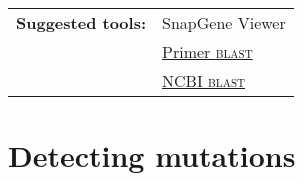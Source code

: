 \documentclass[11pt]{article}
\begin{document}
	\vspace*{\baselineskip}

\noindent\begin{tabular}{@{}ll}
	\textbf{Suggested tools:} & SnapGene Viewer \\
	& \href{https://www.ncbi.nlm.nih.gov/tools/primer-blast/}{Primer \textsc{blast}} \\
	& \href{https://blast.ncbi.nlm.nih.gov/Blast.cgi}{NCBI \textsc{blast}} \\
\end{tabular} 
	
	\section{Detecting mutations\label{sec:mut}}
 	
 	
\end{document}
